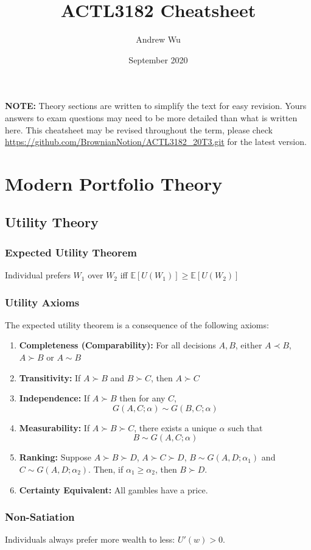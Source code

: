 \documentclass[11pt]{article}
\title{\textbf{ACTL3182 Cheatsheet}}
\author{Andrew Wu}
\date{September 2020}
\newcommand{\E}{\mathbb{E}}
\begin{document}
	\maketitle
	\textbf{NOTE:} Theory sections are written to simplify the text for easy revision. Yours answers to exam questions may need to be more detailed than what is written here. This cheatsheet may be revised throughout the term, please check \url{https://github.com/BrownianNotion/ACTL3182_20T3.git} for the latest version.
	\section{Modern Portfolio Theory}
	\subsection{Utility Theory}
	\subsubsection{Expected Utility Theorem}
	Individual prefers \( W_1 \) over \( W_2 \) iff \( \E[U(W_1)] \geq \E[U(W_2)] \)
	\subsubsection{Utility Axioms}
	The expected utility theorem is a consequence of the following axioms:
	\begin{enumerate}
		\item \textbf{Completeness (Comparability):} For all decisions \( A,B \), either \( A \prec B \), \( A\succ B \) or \( A\sim B \)
		\item \textbf{Transitivity:} If \( A\succ B \) and \( B\succ C \), then \( A\succ C \)
		\item \textbf{Independence:} If \( A\succ B \) then for any \( C \), 
		\[	G(A,C;\alpha) \sim G(B, C; \alpha)\]
		\item \textbf{Measurability:} If \( A\succ B\succ C \), there exists a unique \( \alpha \) such that
		\[ B\sim G(A, C;\alpha)	\]
		\item \textbf{Ranking:} Suppose \( A\succ B\succ D \), \( A\succ C\succ D \), \( B\sim G(A, D;\alpha_1) \) and \( C\sim G(A, D; \alpha_2) \). Then, if \( \alpha_1\geq\alpha_2 \), then \( B\succ D \).
		\item \textbf{Certainty Equivalent:} All gambles have a price.
	\end{enumerate}
	\subsubsection{Non-Satiation}
	Individuals always prefer more wealth to less: \( U'(w) > 0 \).
\end{document}

